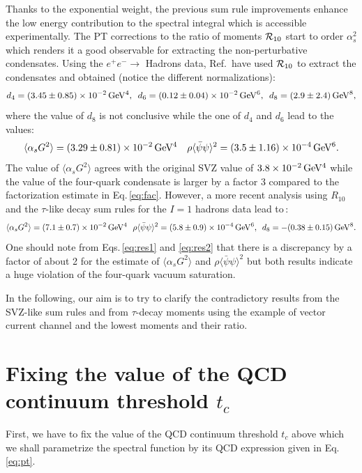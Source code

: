 \documentclass[review]{elsarticle}
\def\beq{\begin{equation}}
\def\eeq{\end{equation}}
\def\la{\langle}
\def\ra{\rangle}
\begin{document}
Thanks to the exponential weight, the previous sum rule improvements enhance the low energy contribution to the spectral integral which is accessible experimentally. The PT corrections to the ratio of moments ${\cal R}_{10}$ start to order $\alpha_s^2$ which renders it a good observable for extracting the non-perturbative condensates.  Using the $e^+e^-\to $ Hadrons data, Ref.\,\cite{LNT} have used ${\cal R}_{10}$
to extract the condensates and obtained (notice the different normalizations):
\beq
d_4=(3.45\pm 0.85)\times 10^{-2}\,{\rm GeV^4},\,\,\,  d_6=(0.12\pm 0.04)\times 10^{-2}\,{\rm GeV^6},\,\,\,  d_8=(2.9\pm 2.4)\,{\rm GeV^8},
\eeq
where the value of $d_8$ is not conclusive while the one of $d_4$ and $d_6$ lead to the values:
\beq
\la\alpha_s G^2\ra= (3.29\pm 0.81)\times 10^{-2}\,{\rm GeV^4}\,\,\,\,\,\, \rho\la\bar\psi\psi\ra^2=(3.5\pm 1.16)\times 10^{-4}\,{\rm GeV^6}.
\label{eq:res1}
\eeq
The value of $\la\alpha_s G^2\ra$ agrees with the original SVZ\cite{SVZa} value of $3.8\times 10^{-2}\,{\rm GeV^4}$ while the value of the four-quark condensate is larger by a factor 3 compared to the factorization estimate in Eq.\,\ref{eq:fac}. However, a more recent analysis using $R_{10}$ and the $\tau$-like decay sum rules for the $I=1$ hadrons data lead to\,\cite{SN95,SNTAU}:
\beq
\la\alpha_s G^2\ra= (7.1\pm 0.7)\times 10^{-2}\,{\rm GeV^4}\,\,\,\, \rho\la\bar\psi\psi\ra^2=(5.8\pm 0.9)\times 10^{-4}\,{\rm GeV^6},\,\,\,  d_8=-(0.38\pm 0.15)\,{\rm GeV^8}.
\label{eq:res2}
\eeq
One should note from Eqs.\,\ref{eq:res1} and \ref{eq:res2} that there is a discrepancy by a factor of about 2 for the estimate of $\la\alpha_s G^2\ra$ and $\rho\la\bar\psi\psi\ra^2$ but both results indicate a huge violation of the four-quark vacuum saturation.

In the following, our aim is to try to clarify the contradictory results from the SVZ-like sum rules and from $\tau$-decay moments using  the example of vector current channel and the lowest moments and their ratio. 

\vspace*{-0.3cm}
\section{Fixing the value of the QCD continuum threshold $t_c$}
\vspace*{-0.20cm}
First, we have to fix the value of the QCD continuum threshold $t_c$ above  which we shall parametrize the spectral function
by its QCD expression given in Eq.\,\ref{eq:pt}. 
\end{document}
